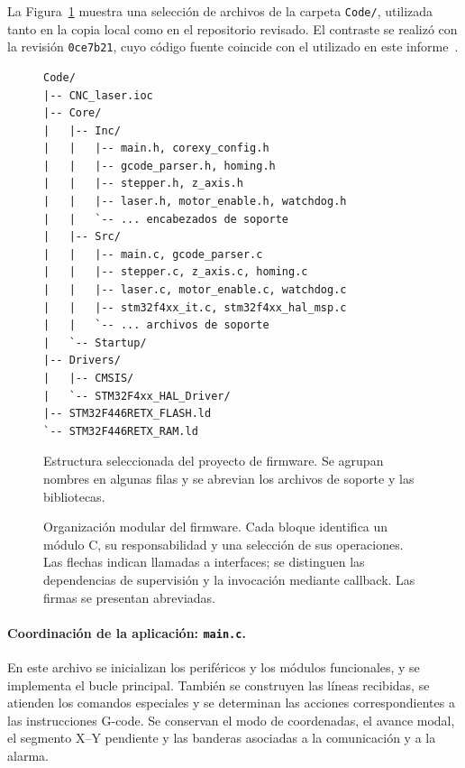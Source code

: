 \documentclass[blue,fullpaper]{ludusofficial}  %
\begin{document}
La Figura~\ref{fig:estructura-firmware} muestra una selección de archivos de la carpeta \texttt{Code/}, utilizada tanto en la copia local como en el repositorio revisado. El contraste se realizó con la revisión \texttt{0ce7b21}, cuyo código fuente coincide con el utilizado en este informe~\cite{firmware_proyecto}.

\begin{figure}[htbp]
    \centering
    \begin{minipage}{0.95\linewidth}
    \small
\begin{verbatim}
Code/
|-- CNC_laser.ioc
|-- Core/
|   |-- Inc/
|   |   |-- main.h, corexy_config.h
|   |   |-- gcode_parser.h, homing.h
|   |   |-- stepper.h, z_axis.h
|   |   |-- laser.h, motor_enable.h, watchdog.h
|   |   `-- ... encabezados de soporte
|   |-- Src/
|   |   |-- main.c, gcode_parser.c
|   |   |-- stepper.c, z_axis.c, homing.c
|   |   |-- laser.c, motor_enable.c, watchdog.c
|   |   |-- stm32f4xx_it.c, stm32f4xx_hal_msp.c
|   |   `-- ... archivos de soporte
|   `-- Startup/
|-- Drivers/
|   |-- CMSIS/
|   `-- STM32F4xx_HAL_Driver/
|-- STM32F446RETX_FLASH.ld
`-- STM32F446RETX_RAM.ld
\end{verbatim}
    \end{minipage}
    \caption{Estructura seleccionada del proyecto de firmware.
    Se agrupan nombres en algunas filas y se abrevian los archivos de soporte y las bibliotecas.}
    \label{fig:estructura-firmware}
\end{figure}

\begin{landscape}
\begin{figure}[p]
    \centering
    \resizebox{\linewidth}{!}{%
    }
    \caption{Organización modular del firmware.
    Cada bloque identifica un módulo C,
    su responsabilidad y una selección
    de sus operaciones. Las flechas indican
    llamadas a interfaces; se distinguen
    las dependencias de supervisión y
    la invocación mediante callback.
    Las firmas se presentan abreviadas.}
    \label{fig:modulos-actuales}
\end{figure}
\end{landscape}

\paragraph{Coordinación de la aplicación: \texttt{main.c}.}
En este archivo se inicializan los periféricos y los
módulos funcionales, y se implementa el bucle principal.
También se construyen las líneas recibidas, se atienden
los comandos especiales y se determinan las acciones
correspondientes a las instrucciones G-code. Se conservan
el modo de coordenadas, el avance modal, el segmento
X--Y pendiente y las banderas asociadas a la comunicación
y a la alarma.
\end{document}
